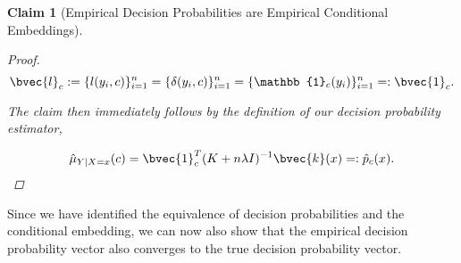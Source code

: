 \documentclass{article}
\newtheorem{claim}[theorem]{Claim}
\begin{document}
\begin{claim}[Empirical Decision Probabilities are Empirical Conditional Embeddings]
\begin{proof}
			\begin{equation}
				\bvec{l}_{c} := \{l(y_{i}, c)\}_{i = 1}^{n} = \{\delta(y_{i}, c)\}_{i = 1}^{n} = \{\mathbb{1}_{c}(y_{i})\}_{i = 1}^{n} =: \bvec{1}_{c}.
			\end{equation}
			
			The claim then immediately follows by the definition of our decision probability estimator,
			
			\begin{equation}
				\hat{\mu}_{Y | X = x}(c) = \bvec{1}_{c}^{T} (K + n \lambda I)^{-1} \bvec{k}(x) =: \hat{p}_{c}(x).
			\end{equation}
		\end{proof}
		
	\end{claim}
	
	Since we have identified the equivalence of decision probabilities and the conditional embedding, we can now also show that the empirical decision probability vector also converges to the true decision probability vector.
\end{document}
